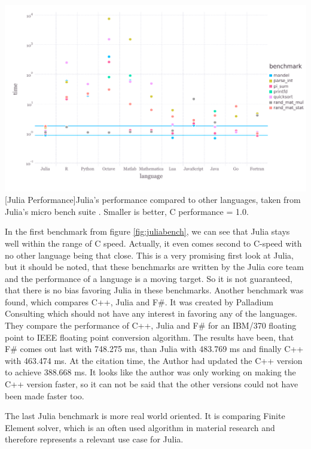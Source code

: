 \vspace{1em}
\begin{minipage}{\linewidth}
    \centering
    \includegraphics[width=0.9\linewidth]{graphics/juliabench.pdf}
    [Julia Performance]{Julia's performance compared to other languages, taken from Julia's micro bench suite \cite{JuliaBench}. Smaller is better, C performance = 1.0.}
    \label{fig:juliabench}
\end{minipage}

In the first benchmark from figure \ref{fig:juliabench}, we can see that Julia stays well within the range of C speed. 
Actually, it even comes second to C-speed with no other language being that close.
This is a very promising first look at Julia, but it should be noted, that these benchmarks are written by the Julia core team and the performance of a language is a moving target.
So it is not guaranteed, that there is no bias favoring Julia in these benchmarks.
Another benchmark was found, which compares C++, Julia and F\#. It was created by Palladium Consulting\cite{PalladiumConsulting} which should not have any interest in favoring any of the languages.
They compare the performance of C++, Julia and F\# for an IBM/370 floating point to IEEE floating point conversion algorithm.
The results\cite{JuliaFSCpp} have been, that F\# comes out last with 748.275 ms, than Julia with 483.769 ms and finally C++ with 463.474 ms. 
At the citation time, the Author had updated the C++ version to achieve 388.668 ms. 
It looks like the author was only working on making the C++ version faster, so it can not be said that the other versions could not have been made faster too.

The last Julia benchmark is more real world oriented. 
It is comparing Finite Element solver, which is an often used algorithm in material research and therefore represents a relevant use case for Julia.

